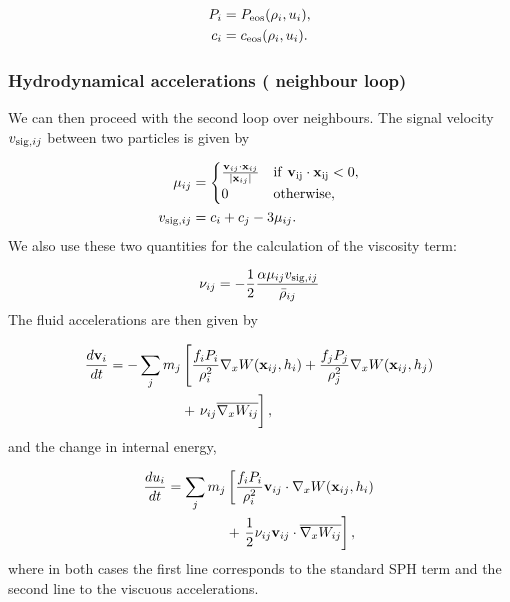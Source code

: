 \begin{align}
  P_i &= P_{\rm eos}(\rho_i, u_i),   \label{eq:sph:minimal:P}\\
  c_i &= c_{\rm eos}(\rho_i, u_i).   \label{eq:sph:minimal:c}
\end{align}

\subsubsection{Hydrodynamical accelerations ( neighbour loop)}

We can then proceed with the second loop over
neighbours. The signal velocity $v_{{\rm sig},ij}$ between two particles is given by

\begin{align}
  \mu_{ij} &=
  \begin{cases}
  \frac{\vec{v}_{ij} \cdot \vec{x}_{ij}}{|\vec{x}_{ij}|}  & \rm{if}~
  \vec{v}_{ij} \cdot \vec{x}_{ij} < 0,\\
    0 &\rm{otherwise}, \\
  \end{cases}\nonumber\\
  v_{{\rm sig},ij} &= c_i + c_j - 3\mu_{ij}.   \label{eq:sph:minimal:v_sig}
\end{align}
We also use these two quantities for the calculation of the viscosity term:

\begin{equation}
\nu_{ij} = -\frac{1}{2}\frac{\alpha \mu_{ij} v_{{\rm
      sig},ij}}{\bar\rho_{ij}}
  \label{eq:sph:minimal:nu_ij}
\end{equation}
The fluid accelerations are then given by

\begin{align}
  \frac{d\vec{v}_i}{dt} = -\sum_j m_j &\left[\frac{f_iP_i}{\rho_i^2}
  \nabla_x W(\vec{x}_{ij}, h_i)   \nonumber
  +\frac{f_jP_j}{\rho_j^2}\nabla_x W(\vec{x}_{ij},h_j)\right. \\
  &+ \left. \bigg.\nu_{ij} \Wij \right], \label{eq:sph:minimal:dv_dt}
\end{align}
and the change in internal energy,

\begin{align}
  \frac{du_i}{dt} = \sum_j m_j &\left[\frac{f_iP_i}{\rho_i^2}  \vec{v}_{ij}
    \cdot \nabla_x W(\vec{x}_{ij}, h_i) \right. \label{eq:sph:minimal:du_dt}\\
    &+\left. \frac{1}{2}\nu_{ij}\vec{v}_{ij}\cdot\Big. \Wij\right], \nonumber
\end{align}
where in both cases the first line corresponds to the standard SPH
term and the second line to the viscuous accelerations.

